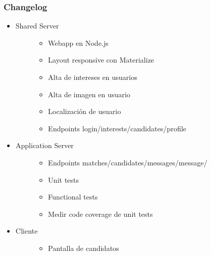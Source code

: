 \documentclass[letterpaper,10pt,english]{sphinxmanual}
\begin{document}
\subsubsection{Changelog}
\label{manuals:id6}\begin{itemize}
\item {} \begin{description}
\item[{Shared Server}] \leavevmode\begin{itemize}
\item {} 
Webapp en Node.js

\item {} 
Layout responsive con Materialize

\item {} 
Alta de intereses en usuarios

\item {} 
Alta de imagen en usuario

\item {} 
Localización de usuario

\item {} 
Endpoints login/interests/candidates/profile

\end{itemize}

\end{description}

\item {} \begin{description}
\item[{Application Server}] \leavevmode\begin{itemize}
\item {} 
Endpoints matches/candidates/messages/message/

\item {} 
Unit tests

\item {} 
Functional tests

\item {} 
Medir code coverage de unit tests

\end{itemize}

\end{description}

\item {} \begin{description}
\item[{Cliente}] \leavevmode\begin{itemize}
\item {} 
Pantalla de candidatos


\end{itemize}
\end{description}
\end{itemize}
\end{document}
